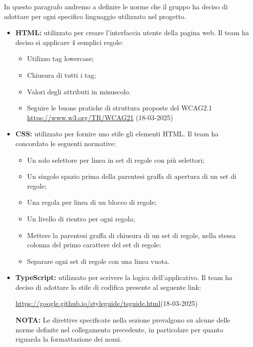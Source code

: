 In questo paragrafo andremo a definire le norme che il gruppo ha deciso di adottare per ogni specifico
linguaggio utilizzato nel progetto.
\begin{itemize}
    \item \textbf{HTML:} utilizzato per creare l'interfaccia utente della pagina web. Il team ha deciso si applicare 4 semplici regole:
    \begin{itemize}
        \item Utilizzo tag lowercase;
        \item Chiusura di tutti i tag;
        \item Valori degli attributi in minuscolo.
        \item Seguire le buone pratiche di struttura proposte del WCAG2.1 \url{https://www.w3.org/TR/WCAG21} (18-03-2025)
    \end{itemize}
    \item \textbf{CSS:} utilizzato per fornire uno stile gli elementi HTML. Il team ha concordato le seguenti normative:
    \begin{itemize}
        \item Un solo selettore per linea in set di regole con più selettori;
        \item Un singolo spazio prima della parentesi graffa di apertura di un set di regole;
        \item Una regola per linea di un blocco di regole;
        \item Un livello di rientro per ogni regola;
        \item Mettere la parentesi graffa di chiusura di un set di regole, nella stessa colonna del primo carattere
        del set di regole;
        \item Separare ogni set di regole con una linea vuota.
    \end{itemize}
    \item \textbf{TypeScript:} utilizzato per scrivere la logica dell'applicativo. 
    Il team ha deciso di adottare lo stile di codifica presente al seguente link:
    \begin{center}
        \url{https://google.github.io/styleguide/tsguide.html}(18-03-2025)
    \end{center}
    \textbf{NOTA:}
    Le direttive specificate nella sezione  prevalgono su alcune delle norme definite nel collegamento precedente,
    in particolare per quanto riguarda la formattazione dei nomi.
\end{itemize}

